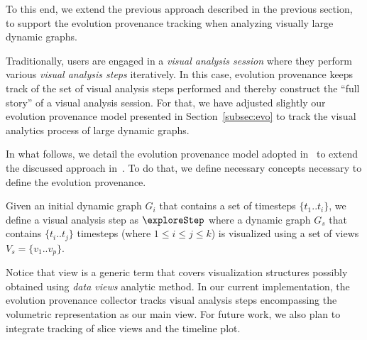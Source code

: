 To this end, we extend the previous approach described in the previous section, to support the evolution provenance tracking when analyzing visually  large dynamic graphs.

Traditionally, users are engaged in a \emph{visual analysis session} where they perform various \emph{visual analysis steps} iteratively. 
In this case, evolution provenance keeps track of the set of visual analysis steps performed and thereby construct the ``full story'' of a visual analysis session.
For that, we have adjusted slightly our evolution provenance model presented in Section~\ref{subsec:evo} to track the visual analytics process of large dynamic graphs. 

In what follows, we detail the evolution provenance model adopted in~\cite{Bruder2019} to extend the discussed approach in~\cite{bruder:18}. To do that, we define necessary concepts necessary to define the evolution provenance.

%
\begin{definition} 
Given an initial dynamic graph $G_i$ that contains a set of timesteps $\{t_1..t_i\}$, we define a visual analysis step as $\exploreStep$ where a dynamic graph $G_s$  that contains $\{t_i..t_j\}$ timesteps  (where $1 \leq i \leq j \leq k $) is visualized using a set of views $V_s=\{v_1..v_p\}$.
\end{definition}


Notice that view is a generic term that covers visualization structures possibly obtained using \emph{data views} analytic method.
In our current implementation, the evolution provenance collector tracks visual analysis steps encompassing the volumetric representation as our main view.
{\color{Fuchsia}For future work, we also plan to integrate tracking of slice views and the timeline plot.}

